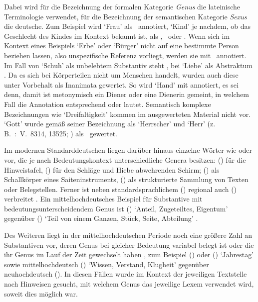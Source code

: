 Dabei wird für die Bezeichnung der formalen Kategorie \textit{Genus} die
lateinische Terminologie verwendet, für die Bezeichnung der semantischen
Kategorie \textit{Sexus} die deutsche. Zum Beispiel wird
 `Frau' als \NeutF\ annotiert,  `Kind' je
nachdem, ob das Geschlecht des Kindes im Kontext bekannt ist, als \NeutM,
\NeutF\ oder \NeutX. Wenn sich im Kontext eines Beispiels 
`Erbe' oder  `Bürger' nicht auf eine bestimmte Person beziehen
lassen, also unspezifische Referenz vorliegt, werden sie mit \MascA\ annotiert.
Im Fall von  `Schuh' als unbelebtem Substantiv steht \MascI, bei
 `Liebe' als Abstraktum \FemI. Da es sich bei Körperteilen nicht um
Menschen handelt, wurden auch diese unter Vorbehalt als Inanimata gewertet. So
wird  `Hand' mit \FemI{} annotiert, es sei denn, damit ist
metonymisch ein Diener oder eine Dienerin gemeint, in welchem Fall die
Annotation entsprechend \FemM{} oder \FemF{} lautet. Semantisch komplexe
Bezeichnungen wie  `Dreifaltigkeit' kommen im ausgewerteten
Material nicht vor.  `Gott' wurde gemäß seiner Bezeichnung als
 `Herrscher' und  `Herr' (z.\,B.\ \KC:~V.~8314, 13525;
\cite[234, 323]{schroeder1895}) als \MascM\ gewertet.

Im modernen Standarddeutschen liegen darüber hinaus einzelne Wörter wie
 oder  vor, die je nach Bedeutungskontext
unterschiedliche Genera besitzen:  (\NeutI) für die
Hinweistafel,  (\MascI) für den Schläge und Hiebe abwehrenden
Schirm;  (\MascI) als Schallkörper eines Saiteninstruments,
 (\NeutI) als strukturierte Sammlung von Texten oder
Belegstellen. Ferner ist neben standardsprachlichem  (\FemI)
regional auch  (\MascI) verbreitet
\autocite[s.\,v.~\textit{der/die Butter}]{elspassmoeller2003}. Ein
mittelhochdeutsches Beispiel für Substantive mit
bedeutungs\-unterscheidendem Genus ist  (\MascI) `Anteil,
Zugeteiltes, Eigentum' gegenüber  (\NeutI) `Teil von einem
Ganzen, Stück, Seite, Abteilung' \autocite[s.\,v.~\textit{teil}]{lexer:mhdhwb}.

Des Weiteren liegt in der mittelhochdeutschen Periode
noch eine größere Zahl an Substantiven vor, deren Genus bei gleicher Bedeutung
variabel belegt ist oder die ihr Genus im Lauf der Zeit gewechselt haben
\autocite[157--166]{ksw2}, zum Beispiel  (\FemI) oder  (\NeutI) `Jahrestag' sowie mittel\-hoch\-deutsch
 (\FemI) `Wissen, Verstand, Klugheit'
\autocite[vgl.][s.\,v.~\textit{witze}]{lexer:mhdhwb} gegenüber
neu\-hoch\-deutsch  (\MascI). In diesen Fällen
wurde im Kontext der jeweiligen Textstelle nach Hinweisen gesucht, mit welchem
Genus das jeweilige Lexem verwendet wird, soweit dies möglich war.


